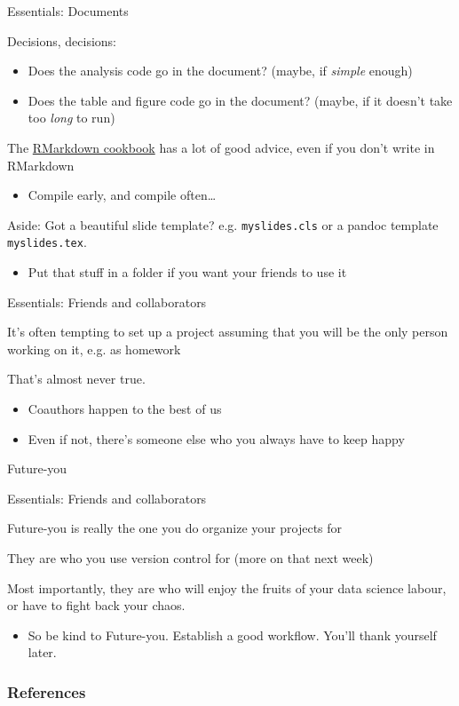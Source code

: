 \documentclass{hertieteaching}
\begin{document}
\begin{frame}[fragile]{Essentials: Documents}
  
Decisions, decisions:
\begin{itemize}
  \item Does the analysis code go in the document? (maybe, if \textit{simple} enough)
  \item Does the table and figure code go in the document? (maybe, if it doesn't take too \textit{long} to run) 
\end{itemize}

The \href{https://bookdown.org/yihui/rmarkdown-cookbook/cache.html}{RMarkdown cookbook} has a lot of good advice, even if you don't write in \textsf{RMarkdown}
\begin{itemize}
  \item Compile early, and compile often\ldots 
\end{itemize}
  
Aside: Got a beautiful slide template? e.g. \texttt{myslides.cls} or a pandoc template \texttt{myslides.tex}.
\begin{itemize}
  \item Put that stuff in a folder if you want your friends to use it
\end{itemize}

  
\end{frame}

\begin{frame}[fragile]{Essentials: Friends and collaborators}

It's often tempting to set up a project assuming that you will be the only person working on it, e.g. as homework

That's almost never true. 
\begin{itemize}
  \item Coauthors happen to the best of us
  \item Even if not, there's someone else who you always have to keep happy
\end{itemize}

\pause

Future-you
\end{frame}
\begin{frame}[fragile]{Essentials: Friends and collaborators}

Future-you is really the one you do organize your projects for

They are who you use version control for (more on that next week)

Most importantly, they are who will enjoy the fruits of your data science labour, or have to fight back your chaos.
\begin{itemize}
  \item So be kind to Future-you. Establish a good workflow. You'll thank yourself later.
\end{itemize}

\end{frame}

\begin{frame}[allowframebreaks]
\frametitle{References}
\printbibliography
\end{frame}
\end{document}
